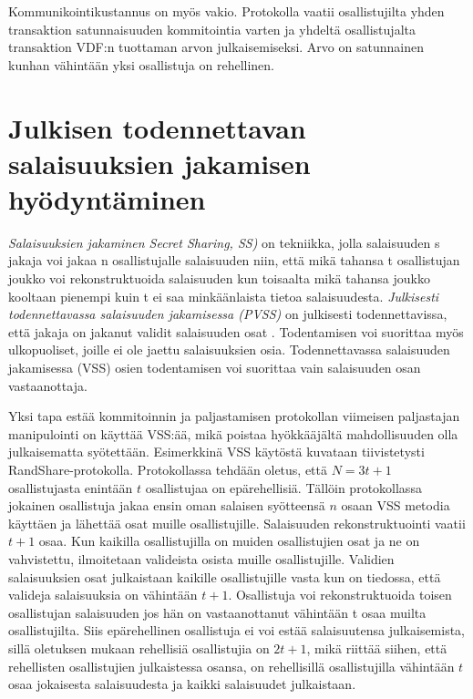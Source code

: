 Kommunikointikustannus on myös vakio. Protokolla vaatii osallistujilta yhden transaktion satunnaisuuden kommitointia varten ja yhdeltä osallistujalta transaktion VDF:n tuottaman arvon julkaisemiseksi. Arvo on satunnainen kunhan vähintään yksi osallistuja on rehellinen.

\section{Julkisen todennettavan salaisuuksien jakamisen hyödyntäminen}

\textit{Salaisuuksien jakaminen Secret Sharing, SS)} on tekniikka, jolla salaisuuden s jakaja voi jakaa n osallistujalle salaisuuden niin, että mikä tahansa t osallistujan joukko voi rekonstruktuoida salaisuuden kun toisaalta mikä tahansa joukko kooltaan pienempi kuin t ei saa minkäänlaista tietoa salaisuudesta\cite{shamir_how_1979}. \textit{Julkisesti todennettavassa salaisuuden jakamisessa (PVSS)} on julkisesti todennettavissa, että jakaja on jakanut validit salaisuuden osat \cite{StadlerMarkus2001PVSS}. Todentamisen voi suorittaa myös ulkopuoliset, joille ei ole jaettu salaisuuksien osia. Todennettavassa salaisuuden jakamisessa (VSS) osien todentamisen voi suorittaa vain salaisuuden osan vastaanottaja.

Yksi tapa estää kommitoinnin ja paljastamisen protokollan viimeisen paljastajan manipulointi on käyttää VSS:ää, mikä poistaa hyökkääjältä mahdollisuuden olla julkaisematta syötettään. Esimerkkinä VSS käytöstä kuvataan tiivistetysti RandShare-protokolla\cite{syta_scalable_2017}. Protokollassa tehdään oletus, että $N = 3t+1$ osallistujasta enintään $t$ osallistujaa on epärehellisiä. Tällöin protokollassa jokainen osallistuja jakaa ensin oman salaisen syötteensä $n$ osaan VSS metodia käyttäen ja lähettää osat muille osallistujille. Salaisuuden rekonstruktuointi vaatii $t+1$ osaa. Kun kaikilla osallistujilla on muiden osallistujien osat ja ne on vahvistettu, ilmoitetaan valideista osista muille osallistujille. Validien salaisuuksien osat julkaistaan kaikille osallistujille vasta kun on tiedossa, että valideja salaisuuksia on vähintään $t+1$. Osallistuja voi rekonstruktuoida toisen osallistujan salaisuuden jos hän on vastaanottanut vähintään t osaa muilta osallistujilta. Siis epärehellinen osallistuja ei voi estää salaisuutensa julkaisemista, sillä oletuksen mukaan rehellisiä osallistujia on $2t+1$, mikä riittää siihen, että rehellisten osallistujien julkaistessa osansa, on rehellisillä osallistujilla vähintään $t$ osaa jokaisesta salaisuudesta ja kaikki salaisuudet julkaistaan. 

